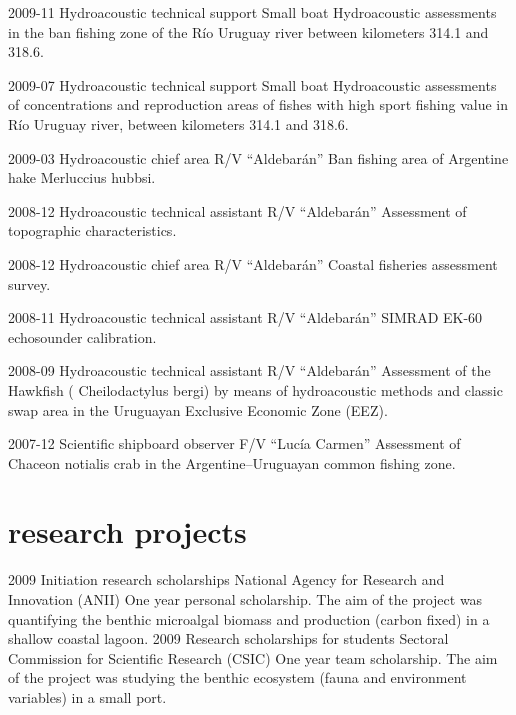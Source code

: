 \documentclass[]{friggeri-cv} %
\begin{document}
\begin{entrylist}

\entry
{2009-11}
{Hydroacoustic technical support}
{Small boat}
{Hydroacoustic assessments in the ban fishing zone of the Río Uruguay river between kilometers 314.1 and 318.6.}

\entry
{2009-07}
{Hydroacoustic technical support}
{Small boat}
{Hydroacoustic assessments of concentrations and reproduction areas of fishes with high sport fishing value in Río Uruguay river, between kilometers 314.1 and 318.6.}

\entry
{2009-03}
{Hydroacoustic chief area}
{R/V ``Aldebarán''}
{Ban fishing area of Argentine hake {\sppfont \color{textcolor} Merluccius hubbsi}.}

\entry
{2008-12}
{Hydroacoustic technical assistant}
{R/V ``Aldebarán''}
{Assessment of topographic characteristics.}

\entry
{2008-12}
{Hydroacoustic chief area}
{R/V ``Aldebarán''}
{Coastal fisheries assessment survey.}

\entry
{2008-11}
{Hydroacoustic technical assistant}
{R/V ``Aldebarán''}
{SIMRAD EK-60 echosounder calibration.}

\entry
{2008-09}
{Hydroacoustic technical assistant}
{R/V ``Aldebarán''}
{Assessment of the Hawkfish ({\sppfont \color{textcolor} Cheilodactylus bergi}) by means of hydroacoustic methods and classic swap area in the Uruguayan Exclusive Economic Zone (EEZ).}

\entry
{2007-12}
{Scientific shipboard observer}
{F/V ``Lucía Carmen''}
{Assessment of {\sppfont \color{textcolor} Chaceon notialis} crab in the Argentine--Uruguayan common fishing zone.}
\end{entrylist}

\section{research projects}
\begin{entrylist}
	\entry
	{2009}
	{Initiation research scholarships}
	{National Agency for Research and Innovation (ANII)}
	{One year personal scholarship. The aim of the project was quantifying the benthic microalgal biomass and production (carbon fixed) in a shallow coastal lagoon.}	
	\entry
	{2009}
	{Research scholarships for students}
	{Sectoral Commission for Scientific Research (CSIC)}
	{One year team scholarship. The aim of the project was studying the benthic ecosystem (fauna and environment variables) in a small port.}
\end{entrylist}
\end{document}
